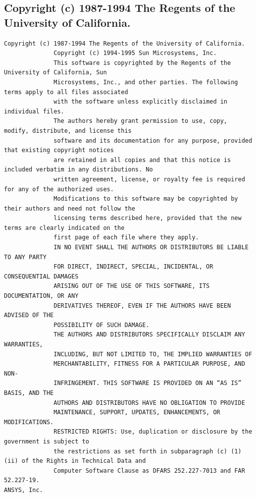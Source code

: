 \subsection{Copyright (c) 1987-1994 The Regents of the University of California.}

\begin{lstlisting}[basicstyle=\ttfamily\scriptsize,breaklines=true]
Copyright (c) 1987-1994 The Regents of the University of California.
              Copyright (c) 1994-1995 Sun Microsystems, Inc.
              This software is copyrighted by the Regents of the University of California, Sun
              Microsystems, Inc., and other parties. The following terms apply to all files associated
              with the software unless explicitly disclaimed in individual files.
              The authors hereby grant permission to use, copy, modify, distribute, and license this
              software and its documentation for any purpose, provided that existing copyright notices
              are retained in all copies and that this notice is included verbatim in any distributions. No
              written agreement, license, or royalty fee is required for any of the authorized uses.
              Modifications to this software may be copyrighted by their authors and need not follow the
              licensing terms described here, provided that the new terms are clearly indicated on the
              first page of each file where they apply.
              IN NO EVENT SHALL THE AUTHORS OR DISTRIBUTORS BE LIABLE TO ANY PARTY
              FOR DIRECT, INDIRECT, SPECIAL, INCIDENTAL, OR CONSEQUENTIAL DAMAGES
              ARISING OUT OF THE USE OF THIS SOFTWARE, ITS DOCUMENTATION, OR ANY
              DERIVATIVES THEREOF, EVEN IF THE AUTHORS HAVE BEEN ADVISED OF THE
              POSSIBILITY OF SUCH DAMAGE.
              THE AUTHORS AND DISTRIBUTORS SPECIFICALLY DISCLAIM ANY WARRANTIES,
              INCLUDING, BUT NOT LIMITED TO, THE IMPLIED WARRANTIES OF
              MERCHANTABILITY, FITNESS FOR A PARTICULAR PURPOSE, AND NON-
              INFRINGEMENT. THIS SOFTWARE IS PROVIDED ON AN “AS IS” BASIS, AND THE
              AUTHORS AND DISTRIBUTORS HAVE NO OBLIGATION TO PROVIDE
              MAINTENANCE, SUPPORT, UPDATES, ENHANCEMENTS, OR MODIFICATIONS.
              RESTRICTED RIGHTS: Use, duplication or disclosure by the government is subject to
              the restrictions as set forth in subparagraph (c) (1) (ii) of the Rights in Technical Data and
              Computer Software Clause as DFARS 252.227-7013 and FAR 52.227-19.
ANSYS, Inc.


\end{lstlisting}
